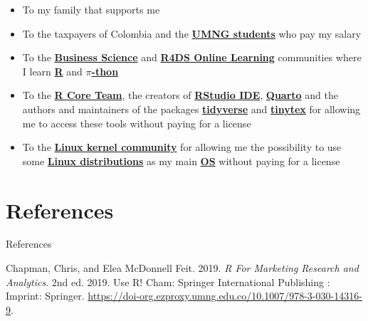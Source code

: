 \documentclass[
  ignorenonframetext,
]{beamer}
\newlength{\cslhangindent}
\newenvironment{CSLReferences}[2] %
 {\begin{list}{}{%
  \setlength{\itemindent}{0pt}
  \setlength{\leftmargin}{0pt}
  \setlength{\parsep}{0pt}
  \ifodd #1
   \setlength{\leftmargin}{\cslhangindent}
   \setlength{\itemindent}{-1\cslhangindent}
  \fi
  \setlength{\itemsep}{#2\baselineskip}}}
 {\end{list}}
\begin{document}
\begin{frame}{}
\label{section-40}
\begin{itemize}
\item
  To my family that supports me
\item
  To the taxpayers of Colombia and the
  \href{https://www.umng.edu.co/estudiante}{\textbf{UMNG students}} who
  pay my salary
\item
  To the \href{https://www.business-science.io/}{\textbf{Business
  Science}} and \href{https://www.rfordatasci.com/}{\textbf{R4DS Online
  Learning}} communities where I learn
  \href{https://www.r-project.org/about.html}{\textbf{R}} and
  \href{https://www.python.org/about/}{\textbf{\(\pi\)-thon}}
\item
  To the \href{https://www.r-project.org/contributors.html}{\textbf{R
  Core Team}}, the creators of
  \href{https://posit.co/products/open-source/rstudio/}{\textbf{RStudio
  IDE}}, \href{https://quarto.org/}{\textbf{Quarto}} and the authors and
  maintainers of the packages
  \href{https://CRAN.R-project.org/package=tidyverse}{\textbf{tidyverse}}
  and
  \href{https://CRAN.R-project.org/package=tinytex}{\textbf{tinytex}}
  for allowing me to access these tools without paying for a license
\item
  To the \href{https://www.kernel.org/category/about.html}{\textbf{Linux
  kernel community}} for allowing me the possibility to use some
  \href{https://static.lwn.net/Distributions/}{\textbf{Linux
  distributions}} as my main
  \href{https://en.wikipedia.org/wiki/Operating_system}{\textbf{OS}}
  without paying for a license
\end{itemize}
\end{frame}

\section*{References}\label{references}

\begin{frame}[allowframebreaks]{References}
\label{refs}
\begin{CSLReferences}{1}{0}
Chapman, Chris, and Elea McDonnell Feit. 2019. \emph{R {For} {Marketing}
{Research} and {Analytics}}. 2nd ed. 2019. Use {R}! Cham: Springer
International Publishing : Imprint: Springer.
\url{https://doi-org.ezproxy.umng.edu.co/10.1007/978-3-030-14316-9}.

\end{CSLReferences}
\end{frame}
\end{document}
